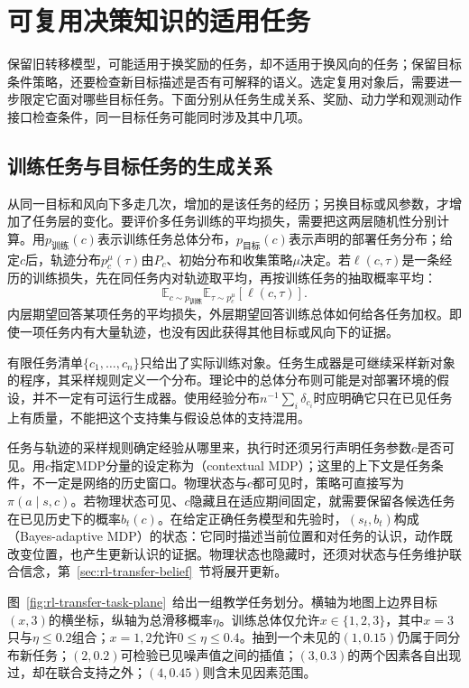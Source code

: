 \section{可复用决策知识的适用任务}
\label{sec:rl-transfer-applicability}

保留旧转移模型，可能适用于换奖励的任务，却不适用于换风向的任务；保留目标条件策略，还要检查新目标描述是否有可解释的语义。选定复用对象后，需要进一步限定它面对哪些目标任务。下面分别从任务生成关系、奖励、动力学和观测动作接口检查条件，同一目标任务可能同时涉及其中几项。

\subsection{训练任务与目标任务的生成关系}
\label{sec:rl-transfer-distributions}

从同一目标和风向下多走几次，增加的是该任务的经历；另换目标或风参数，才增加了任务层的变化。要评价多任务训练的平均损失，需要把这两层随机性分别计算。用$p_{\text{训练}}(c)$表示训练任务总体分布，$p_{\text{目标}}(c)$表示声明的部署任务分布；给定$c$后，轨迹分布$p_c^\mu(\tau)$由$P_c$、初始分布和收集策略$\mu$决定。若$\ell(c,\tau)$是一条经历的训练损失，先在同任务内对轨迹取平均，再按训练任务的抽取概率平均：
\[
  \mathbb E_{c\sim p_{\text{训练}}}
  \mathbb E_{\tau\sim p_c^\mu}[\ell(c,\tau)].
\]
内层期望回答某项任务的平均损失，外层期望回答训练总体如何给各任务加权。即使一项任务内有大量轨迹，也没有因此获得其他目标或风向下的证据。

有限任务清单$\{c_1,\ldots,c_n\}$只给出了实际训练对象。任务生成器是可继续采样新对象的程序，其采样规则定义一个分布。理论中的总体分布则可能是对部署环境的假设，并不一定有可运行生成器。使用经验分布$n^{-1}\sum_i\delta_{c_i}$时应明确它只在已见任务上有质量，不能把这个支持集与假设总体的支持混用。

任务与轨迹的采样规则确定经验从哪里来，执行时还须另行声明任务参数$c$是否可见。用$c$指定MDP分量的设定称为（contextual MDP）；这里的上下文是任务条件，不一定是网络的历史窗口。物理状态与$c$都可见时，策略可直接写为$\pi(a\mid s,c)$。若物理状态可见、$c$隐藏且在适应期间固定，就需要保留各候选任务在已见历史下的概率$b_t(c)$。在给定正确任务模型和先验时，$(s_t,b_t)$构成（Bayes-adaptive MDP）的状态：它同时描述当前位置和对任务的认识，动作既改变位置，也产生更新认识的证据。物理状态也隐藏时，还须对状态与任务维护联合信念，第~\ref{sec:rl-transfer-belief}~节将展开更新。

图~\ref{fig:rl-transfer-task-plane}~给出一组教学任务划分。横轴为地图上边界目标$(x,3)$的横坐标，纵轴为总滑移概率$\eta$。训练总体仅允许$x\in\{1,2,3\}$，其中$x=3$只与$\eta\leq0.2$组合；$x=1,2$允许$0\leq\eta\leq0.4$。抽到一个未见的$(1,0.15)$仍属于同分布新任务；$(2,0.2)$可检验已见噪声值之间的插值；$(3,0.3)$的两个因素各自出现过，却在联合支持之外；$(4,0.45)$则含未见因素范围。

